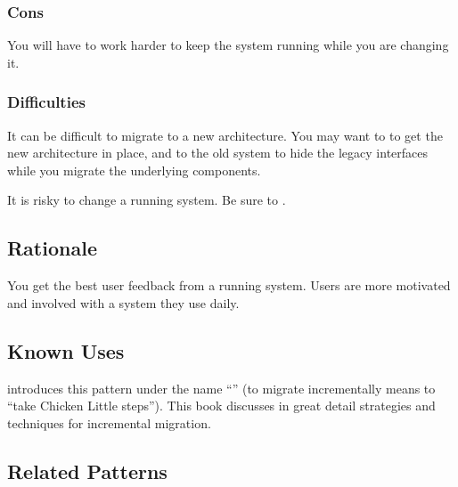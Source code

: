 \documentclass[a4paper,10pt,twoside]{book}
\begin{document}
\subsubsection*{Cons}

\begin{bulletlist}
\item You will have to work harder to keep the system running while you are changing it.
\end{bulletlist}

\subsubsection*{Difficulties}

\begin{bulletlist}
\item It can be difficult to migrate to a new architecture. You may want to  to get the new architecture in place, and  to the old system to hide the legacy interfaces while you migrate the underlying components.

\item It is risky to change a running system. Be sure to . 
\end{bulletlist}

\subsection*{Rationale}

You get the best user feedback from a running system. Users are more motivated and involved with a system they use daily.

\subsection*{Known Uses}

 \cite{Brod95a} introduces this pattern under the name ``'' (to migrate incrementally means to ``take Chicken Little steps''). This book discusses in great detail strategies and techniques for incremental migration.

\subsection*{Related Patterns}
\end{document}
